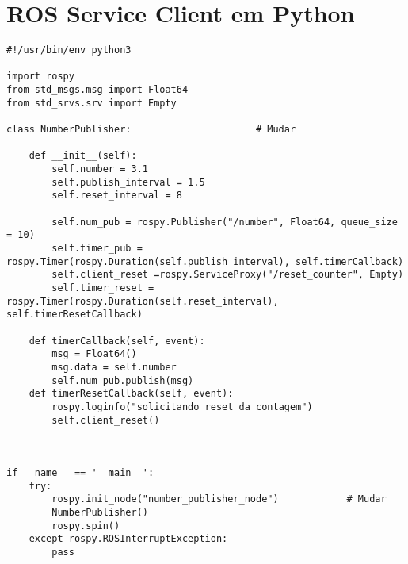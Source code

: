 \documentclass[letterpaper]{article}
\begin{document}
\section{ROS Service Client em Python}

\begin{lstlisting}[style=pythonStyle, title=number\_publish.py] 
#!/usr/bin/env python3

import rospy
from std_msgs.msg import Float64
from std_srvs.srv import Empty

class NumberPublisher:         	            # Mudar

    def __init__(self):
        self.number = 3.1
        self.publish_interval = 1.5
        self.reset_interval = 8

        self.num_pub = rospy.Publisher("/number", Float64, queue_size = 10)
        self.timer_pub = rospy.Timer(rospy.Duration(self.publish_interval), self.timerCallback)
        self.client_reset =rospy.ServiceProxy("/reset_counter", Empty)
        self.timer_reset = rospy.Timer(rospy.Duration(self.reset_interval), self.timerResetCallback)

    def timerCallback(self, event):
        msg = Float64()
        msg.data = self.number
        self.num_pub.publish(msg)
    def timerResetCallback(self, event):
        rospy.loginfo("solicitando reset da contagem")
        self.client_reset()
        
        

if __name__ == '__main__':
    try:
        rospy.init_node("number_publisher_node")	        # Mudar
        NumberPublisher()
        rospy.spin()
    except rospy.ROSInterruptException:
        pass

\end{lstlisting}
\end{document}
